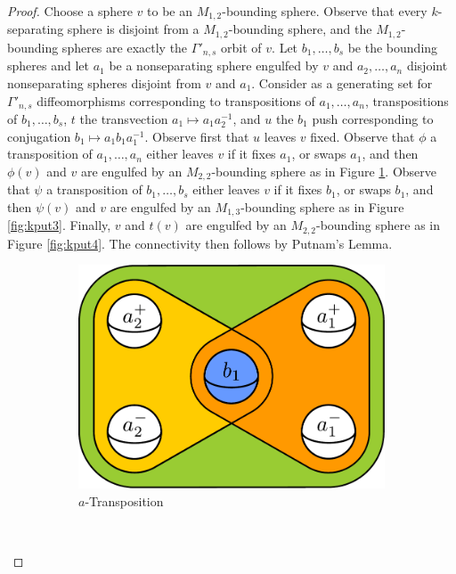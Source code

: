 \documentclass[11pt]{article}
\theoremstyle{remark}
\theoremstyle{definition}
\begin{document}
\begin{proof}
Choose a sphere $v$ to be an $M_{1,2}$-bounding sphere.
Observe that every $k$-separating sphere is disjoint from a
$M_{1,2}$-bounding sphere, and the $M_{1,2}$-bounding spheres
are exactly the $\Gamma'_{n,s}$ orbit of $v$.
Let $b_1,\ldots,b_s$ be the bounding spheres
and let $a_1$ be a nonseparating sphere engulfed by $v$ and $a_2, \ldots, a_n$
disjoint nonseparating spheres disjoint from $v$ and $a_1$.
Consider as a generating set for $\Gamma'_{n,s}$
diffeomorphisms corresponding to
transpositions of $a_1,\ldots,a_n$,
transpositions of $b_1,\ldots,b_s$,
$t$ the transvection $a_1 \mapsto a_1a_2^{-1}$,
and $u$ the $b_1$ push corresponding to
conjugation $b_1 \mapsto a_1b_1a_1^{-1}$.
Observe first that $u$ leaves $v$ fixed.
Observe  that $\phi$ a
transposition of  $a_1,\ldots,a_n$
either leaves $v$ if it fixes $a_1$, or
swaps $a_1$, and then $\phi(v)$ and $v$
are engulfed by an $M_{2,2}$-bounding sphere as in Figure \ref{fig:kput2}.
Observe that $\psi$ a
transposition of  $b_1,\ldots,b_s$
either leaves $v$ if it fixes $b_1$, or
swaps $b_1$, and then $\psi(v)$ and $v$
are engulfed by an $M_{1,3}$-bounding sphere as in Figure \ref{fig:kput3}.
Finally,
$v$ and $t(v)$
are engulfed by an $M_{2,2}$-bounding sphere as in Figure \ref{fig:kput4}.
The connectivity then follows by Putnam's Lemma.
\begin{figure}[b!]
    \centering
    \begin{subfigure}[b]{0.3\textwidth}
        \includegraphics[width=\textwidth]{figures/kput2.pdf}
        \caption{$a$-Transposition}
        \label{fig:kput2}
    \end{subfigure}
    ~
    \begin{subfigure}[b]{0.3\textwidth}

\end{subfigure}
\end{figure}
\end{proof}
\end{document}
